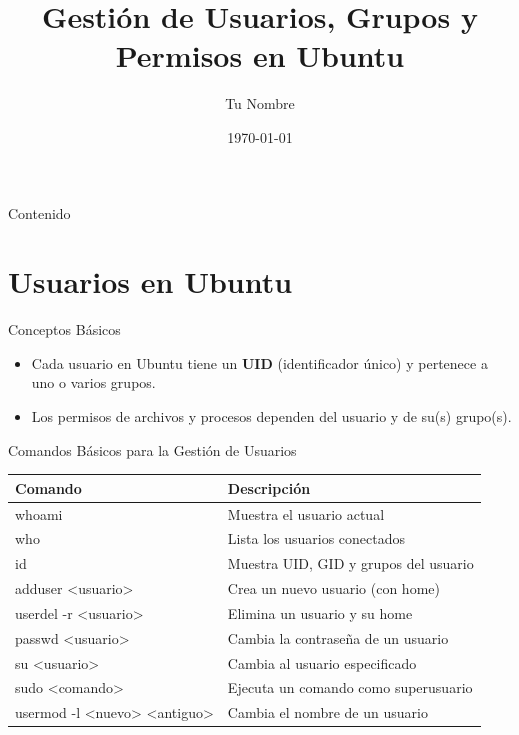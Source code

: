 \documentclass{beamer}
\title{Gestión de Usuarios, Grupos y Permisos en Ubuntu}
\author{Tu Nombre}
\date{\today}
\begin{document}
\begin{frame}
    \titlepage
\end{frame}

\begin{frame}{Contenido}
    \tableofcontents
\end{frame}

\section{Usuarios en Ubuntu}

\begin{frame}{Conceptos Básicos}
    \begin{itemize}
        \item Cada usuario en Ubuntu tiene un \textbf{UID} (identificador único) y pertenece a uno o varios grupos.
        \item Los permisos de archivos y procesos dependen del usuario y de su(s) grupo(s).
    \end{itemize}
\end{frame}

\begin{frame}{Comandos Básicos para la Gestión de Usuarios}
    \begin{center}
    \begin{tabular}{l l}
    \hline
    \textbf{Comando} & \textbf{Descripción} \\
    \hline
    whoami & Muestra el usuario actual \\
    who & Lista los usuarios conectados \\
    id & Muestra UID, GID y grupos del usuario \\
    adduser <usuario> & Crea un nuevo usuario (con home) \\
    userdel -r <usuario> & Elimina un usuario y su home \\
    passwd <usuario> & Cambia la contraseña de un usuario \\
    su <usuario> & Cambia al usuario especificado \\
    sudo <comando> & Ejecuta un comando como superusuario \\
    usermod -l <nuevo> <antiguo> & Cambia el nombre de un usuario \\
    \hline
    \end{tabular}
    \end{center}
\end{frame}
\end{document}
